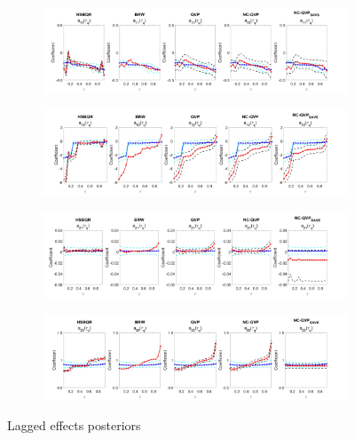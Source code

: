 \begin{figure}[H]
     \centering
     \begin{subfigure}[b]{\textwidth}
         \centering
         \includegraphics[width=\textwidth]{Figures/FigureCoeff2.jpg}
     \end{subfigure}
     \vfill
     \begin{subfigure}[b]{\textwidth}
         \centering
         \includegraphics[width=\textwidth]{Figures/FigureCoeff3.jpg}
     \end{subfigure}
     \vfill
     \begin{subfigure}[b]{\textwidth}
         \centering
         \includegraphics[width=\textwidth]{Figures/FigureCoeff5.jpg}
     \end{subfigure}
     \vfill
     \begin{subfigure}[b]{\textwidth}
         \centering
         \includegraphics[width=\textwidth]{Figures/FigureCoeff6.jpg}
     \end{subfigure}
        \caption{Lagged effects posteriors}
        \label{fig:CoeffsLag}
\end{figure}